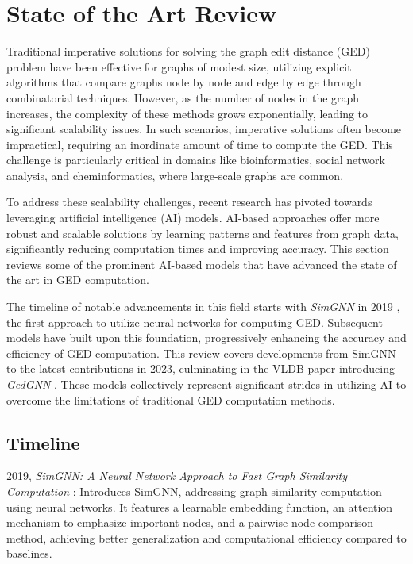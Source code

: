 \documentclass[../Thesis.tex]{subfiles}
\begin{document}
	
	\section{State of the Art Review}
	\label{sec:state_of_the_art_review}
	
	Traditional imperative solutions for solving the graph edit distance (GED) problem have been effective for graphs of modest size, utilizing explicit algorithms that compare graphs node by node and edge by edge through combinatorial techniques. However, as the number of nodes in the graph increases, the complexity of these methods grows exponentially, leading to significant scalability issues. In such scenarios, imperative solutions often become impractical, requiring an inordinate amount of time to compute the GED. This challenge is particularly critical in domains like bioinformatics, social network analysis, and cheminformatics, where large-scale graphs are common.
	
	To address these scalability challenges, recent research has pivoted towards leveraging artificial intelligence (AI) models. AI-based approaches offer more robust and scalable solutions by learning patterns and features from graph data, significantly reducing computation times and improving accuracy. This section reviews some of the prominent AI-based models that have advanced the state of the art in GED computation.

	The timeline of notable advancements in this field starts with \textit{SimGNN} in 2019 \cite{simgnn__a_neural_network_approach_to_fast_graph_similarity_computation}, the first approach to utilize neural networks for computing GED. Subsequent models have built upon this foundation, progressively enhancing the accuracy and efficiency of GED computation. This review covers developments from SimGNN to the latest contributions in 2023, culminating in the VLDB paper introducing \textit{GedGNN} \cite{computing_graph_edit_distance_via_neural_graph_matching}. These models collectively represent significant strides in utilizing AI to overcome the limitations of traditional GED computation methods.
	
	\subsection{Timeline}
	\label{subsec:timeline}
	
	2019, \textit{SimGNN: A Neural Network Approach to Fast Graph Similarity Computation} \cite{simgnn__a_neural_network_approach_to_fast_graph_similarity_computation}: Introduces SimGNN, addressing graph similarity computation using neural networks. It features a learnable embedding function, an attention mechanism to emphasize important nodes, and a pairwise node comparison method, achieving better generalization and computational efficiency compared to baselines.
	
\end{document}
